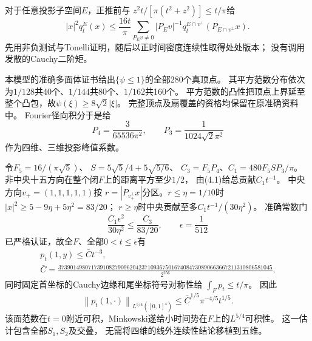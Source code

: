 \documentclass[UTF8,fontset=fandol,zihao=-4,a4paper]{ctexart}
\newcommand{\1}{\mathbf 1}
\newcommand{\norm}[1]{\left\lVert#1\right\rVert}
\begin{document}
对于任意投影子空间$E$，正推前与
$z^2t/[\pi(t^2+z^2)]\le t/\pi$给
\[
 |x|^2q_t^E(x)\le\frac{16t}{\pi}
 \sum_{P_Ev\ne0}|P_Ev|^{-1}q_t^{E\cap v^\perp}(P_{E\cap v^\perp}x).
 \tag{4.1}
\]
先用非负测试与Tonelli证明，随后以正时间密度连续性取得处处版本；
没有调用发散的Cauchy二阶矩。

本模型的准确多面体证书给出$\{\psi\le1\}$的全部280个真顶点。
其平方范数分布依次为$1/128$共40个、$1/144$共80个、$1/162$共160个。
平方范数的凸性把顶点上界延至整个凸包，故$\psi(\xi)\ge8\sqrt2|\xi|$。
完整顶点及扇覆盖的资格均保留在原准确资料中。
Fourier径向积分于是给
\[
 P_4=\frac3{65536\pi^2},\qquad P_3=\frac1{1024\sqrt2\pi^2}
\]
作为四维、三维投影峰值系数。

令$F_5=16/(\pi\sqrt5)$、
$S=5\sqrt5/4+5\sqrt{5/6}$、
$C_3=F_5P_4$、$C_1=480F_5SP_3/\pi$。
非中央十五方向在整个闭$F$上的距离平方至少$1/2$，
由(4.1)给总贡献$C_1t^{-1}$。
中央方向$v_+=(1,1,1,1,1)$按
$r=|P_{v_+^\perp}x|$分区。$r\le\eta=1/10$时
$|x|^2\ge5-9\eta+5\eta^2=83/20$；
$r\ge\eta$时中央贡献至多$C_1t^{-1}/(30\eta^2)$。
准确常数门
\[
 \frac{C_1\epsilon^2}{30\eta^2}\le\frac{C_3}{83/20},
 \qquad \epsilon=\frac1{512}
\]
已严格认证，故全$F$、全部$0<t\le\epsilon$有
\[
 \begin{gathered}
 p_t(1,y)\le\bar C t^{-3},\\
 \bar C=\frac{373901498071739108279096204237109367501674084730890663667211310806581045}{2^{256}}.
 \end{gathered}
 \tag{4.2}
\]
同时固定首坐标的Cauchy边缘和尾坐标符号对称性给
$\int_Fp_t\le t/\pi$。
因此
\[
 \norm{p_t(1,\cdot)}_{L^{5/4}([0,1]^4)}
 \le\bar C^{1/5}\pi^{-4/5}t^{1/5}.
\]
该面范数在$t=0$附近可积，Minkowski遂给小时间势在$F$上的$L^{5/4}$可积性。
这一估计包含全部$S_1,S_2$及交叠，
无需将四维的线外连续性结论移植到五维。
\end{document}

